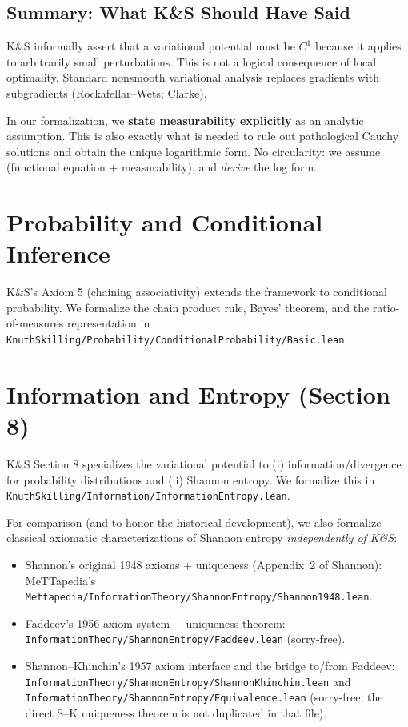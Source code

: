 \documentclass[11pt]{article}
\theoremstyle{definition}
\theoremstyle{remark}
\begin{document}
\subsection{Summary: What K\&S Should Have Said}

K\&S informally assert that a variational potential must be $C^1$ because it applies to arbitrarily small perturbations.
This is not a logical consequence of local optimality.
Standard nonsmooth variational analysis replaces gradients with subgradients (Rockafellar--Wets; Clarke).

In our formalization, we \textbf{state measurability explicitly} as an analytic assumption.
This is also exactly what is needed to rule out pathological Cauchy solutions and obtain the unique logarithmic form.
No circularity: we assume (functional equation + measurability), and \emph{derive} the log form.

\section{Probability and Conditional Inference}

K\&S's Axiom 5 (chaining associativity) extends the framework to conditional probability.
We formalize the chain product rule, Bayes' theorem, and the ratio-of-measures representation in
\texttt{KnuthSkilling/Probability/ConditionalProbability/Basic.lean}.

\section{Information and Entropy (Section 8)}

K\&S Section 8 specializes the variational potential to (i) information/divergence for probability
distributions and (ii) Shannon entropy.
We formalize this in
\texttt{KnuthSkilling/Information/InformationEntropy.lean}.

For comparison (and to honor the historical development), we also formalize classical axiomatic
characterizations of Shannon entropy \emph{independently of K\&S}:
\begin{itemize}
\item Shannon's original 1948 axioms + uniqueness (Appendix~2 of Shannon): MeTTapedia's \texttt{Mettapedia/InformationTheory/ShannonEntropy/Shannon1948.lean}.
\item Faddeev's 1956 axiom system + uniqueness theorem: \texttt{InformationTheory/ShannonEntropy/Faddeev.lean} (sorry-free).
\item Shannon--Khinchin's 1957 axiom interface and the bridge to/from Faddeev:
\texttt{InformationTheory/ShannonEntropy/ShannonKhinchin.lean} and
\texttt{InformationTheory/ShannonEntropy/Equivalence.lean} (sorry-free; the direct S--K uniqueness theorem is not duplicated in that file).
\end{itemize}
\end{document}
